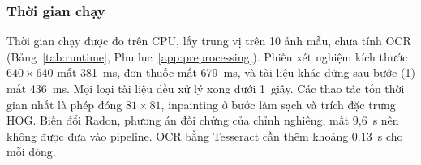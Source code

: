 \subsubsection{Thời gian chạy}
Thời gian chạy được đo trên CPU, lấy trung vị trên 10 ảnh mẫu, chưa tính OCR (Bảng~\ref{tab:runtime}, Phụ lục~\ref{app:preprocessing}).
Phiếu xét nghiệm kích thước $640\times640$ mất \SI{381}{ms}, đơn thuốc mất \SI{679}{ms}, và tài liệu khác dừng sau bước (1) mất \SI{436}{ms}.
Mọi loại tài liệu đều xử lý xong dưới 1~giây.
Các thao tác tốn thời gian nhất là phép đóng $81\times81$, inpainting ở bước làm sạch và trích đặc trưng HOG.
Biến đổi Radon, phương án đối chứng của chỉnh nghiêng, mất 9,6~s nên không được đưa vào pipeline.
OCR bằng Tesseract cần thêm khoảng \SI{0.13}{s} cho mỗi dòng.
